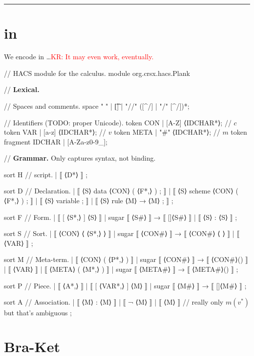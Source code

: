 \documentclass[letterpaper,11pt]{article}
\newcommand{\KR}[1]{\textcolor{red}{KR: #1}}
\begin{document}




\hrule
\vspace*{1pc}

\appendix

\section{\bhax in \HAX}

We encode \hax in \HAX…\KR{It may even work, eventually.}
%
\begin{hacs}[numbers=right,texcl]
// HACS module for the \hax calculus.
module org.crsx.hacs.Plank {

// \textbf{Lexical.}

// Spaces and comments.
space " " | [\t\n] | "//" ([^/\n] | "/" [^/\n])*;

// Identifiers (TODO: proper Unicode).
token CON   | [A-Z] ⟨IDCHAR*⟩;   // $c$
token VAR   | [a-z] ⟨IDCHAR*⟩;    // $v$
token META  | "#" ⟨IDCHAR*⟩;     // $m$
token fragment IDCHAR | [A-Za-z0-9_];

// \textbf{Grammar.} Only captures syntax, not binding.

sort H // \hax script.
| ⟦ ⟨D*⟩ ⟧
;

sort D // Declaration.
| ⟦ ⟨S⟩ data ⟨CON⟩ ( ⟨F*,⟩ ) ; ⟧
| ⟦ ⟨S⟩ scheme ⟨CON⟩ ( ⟨F*,⟩ ) ; ⟧
| ⟦ ⟨S⟩ variable ; ⟧
| ⟦ ⟨S⟩ rule ⟨M⟩ → ⟨M⟩ ; ⟧
;

sort F // Form.
| ⟦ [ ⟨S*,⟩ ] ⟨S⟩ ⟧  | sugar ⟦ ⟨S#⟩ ⟧ → ⟦ []⟨S#⟩ ⟧
| ⟦ { ⟨S⟩ : ⟨S⟩ } ⟧
;


sort S // Sort.
| ⟦ ⟨CON⟩ ⟨ ⟨S*,⟩ ⟩ ⟧  | sugar ⟦ ⟨CON#⟩ ⟧ → ⟦ ⟨CON#⟩ ⟨ ⟩ ⟧
| ⟦ ⟨VAR⟩ ⟧
;

sort M // Meta-term.
| ⟦ ⟨CON⟩ ( ⟨P*,⟩ ) ⟧  | sugar ⟦ ⟨CON#⟩ ⟧ → ⟦ ⟨CON#⟩() ⟧
| ⟦ ⟨VAR⟩ ⟧
| ⟦ ⟨META⟩ ( ⟨M*,⟩ ) ⟧  | sugar ⟦ ⟨META#⟩ ⟧ → ⟦ ⟨META#⟩() ⟧
;

sort P // Piece.
| ⟦ { ⟨A*,⟩ } ⟧
| ⟦ [ ⟨VAR*,⟩ ] ⟨M⟩ ⟧   | sugar ⟦ ⟨M#⟩ ⟧ → ⟦ []⟨M#⟩ ⟧
;

sort A // Association.
| ⟦ ⟨M⟩ : ⟨M⟩ ⟧
| ⟦ ¬ ⟨M⟩ ⟧
| ⟦ ⟨M⟩ ⟧  // really only $m(v^*)$ but that's ambiguous
;

}
\end{hacs}


\section{Bra-Ket}
\end{document}
